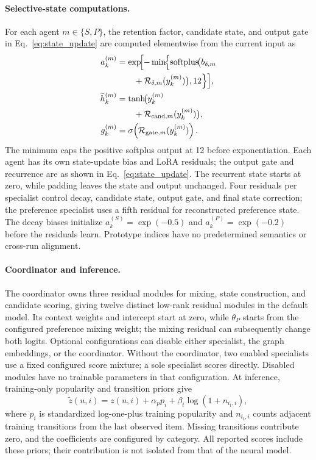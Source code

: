 \documentclass[11pt]{article}
\begin{document}
\paragraph{Selective-state computations.}
For each agent $m\in\{S,P\}$, the retention factor, candidate state, and output gate in Eq.~\eqref{eq:state_update} are computed elementwise from the current input as
\begin{align}
 a_k^{(m)}&=\exp\!\Bigl[-\min\!\Bigl\{
    \operatorname{softplus}\!\bigl(b_{\delta,m}\notag\\
 &\qquad+\mathcal R_{\delta,m}(y_k^{(m)})\bigr),12\Bigr\}\Bigr],\notag\\
 \widetilde h_k^{(m)}&=\tanh\!\bigl(y_k^{(m)}\notag\\
 &\qquad+\mathcal R_{\mathrm{cand},m}(y_k^{(m)})\bigr),\notag\\
 g_k^{(m)}&=\sigma\!\left(\mathcal R_{\mathrm{gate},m}(y_k^{(m)})\right).
\end{align}
The minimum caps the positive softplus output at 12 before exponentiation. Each agent has its own state-update bias and LoRA residuals; the output gate and recurrence are as shown in Eq.~\eqref{eq:state_update}. The recurrent state starts at zero, while padding leaves the state and output unchanged. Four residuals per specialist control decay, candidate state, output gate, and final state correction; the preference specialist uses a fifth residual for reconstructed preference state. The decay biases initialize $a_k^{(S)}=\exp(-0.5)$ and $a_k^{(P)}=\exp(-0.2)$ before the residuals learn. Prototype indices have no predetermined semantics or cross-run alignment.

\paragraph{Coordinator and inference.}
The coordinator owns three residual modules for mixing, state construction, and candidate scoring, giving twelve distinct low-rank residual modules in the default model. Its context weights and intercept start at zero, while $\theta_P$ starts from the configured preference mixing weight; the mixing residual can subsequently change both logits. Optional configurations can disable either specialist, the graph embeddings, or the coordinator. Without the coordinator, two enabled specialists use a fixed configured score mixture; a sole specialist scores directly. Disabled modules have no trainable parameters in that configuration. At inference, training-only popularity and transition priors give
\begin{equation}
 \widetilde z(u,i)=z(u,i)+\alpha_p p_i+\beta_t\log(1+n_{i_t,i}),
\end{equation}
where $p_i$ is standardized log-one-plus training popularity and $n_{i_t,i}$ counts adjacent training transitions from the last observed item. Missing transitions contribute zero, and the coefficients are configured by category. All reported scores include these priors; their contribution is not isolated from that of the neural model.
\end{document}
